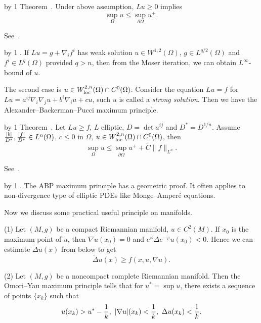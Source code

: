 \advance\propcount by 1
\proclaim Theorem~\propnumber.
Under above assumption, $Lu\geq 0$ implies
$$\sup_\Omega u\leq\sup_{\partial\Omega}u^+.$$

\demo
See~\cite[Theorem 8.1]{G-T}.
\enddemo

\advance\propcount by 1
.
If $Lu=g+\nabla_if^i$ has weak solution $u\in W^{1,2}(\Omega)$, $g\in L^{q/2}(\Omega)$ and $f^i\in L^q(\Omega)$ provided $q>n$, then from the Moser iteration, we can obtain $L^\infty$-bound of $u$.
\medskip

The second case is $u\in W^{2,n}_{\rm loc}(\Omega)\cap C^0(\bar\Omega)$.
Consider the equation $Lu=f$ for $Lu=a^{ij}\nabla_i\nabla_ju+b^i\nabla_iu+cu$, such $u$ is called a {\it strong solution}.
Then we have the Alexander--Backerman--Pucci maximum principle.

\advance\propcount by 1
\proclaim Theorem~\propnumber.
Let $Lu\geq f$, $L$ elliptic, $D=\det{a^{ij}}$ and $D^*=D^{1/n}$.
Assume ${|b|\over D^*},{|f|\over D^*}\in L^n(\Omega)$, $c\leq 0$ in $\Omega$, $u\in W^{2,n}_{\rm loc}(\Omega)\cap C^0(\bar\Omega)$, then
$$\sup_\Omega u\leq\sup_{\partial\Omega}u^++\tilde{C}\|f\|_{L^n}.$$

\demo
See~\cite[Theorem 9.1]{G-T}.
\enddemo

\advance\propcount by 1
.
The ABP maximum principle has a geometric proof.
It often applies to non-divergence type of elliptic PDEs like Monge--Amper\'e equations.
\medskip

Now we discuss some practical useful principle on manifolds.
\smallskip
\item {(1)} Let $(M,g)$ be a compact Riemannian manifold, $u\in C^2(M)$.
If $x_0$ is the maximum point of $u$, then $\nabla u(x_0)=0$ and $e^\varphi\Delta e^{-\varphi}u(x_0)<0$.
Hence we can estimate $\tilde{\Delta}u(x)$ from below to get
$$\tilde{\Delta}u(x)\geq f(x,u,\nabla u).$$
\item {(2)} Let $(M,g)$ be a noncompact complete Riemannian manifold.
Then the Omori--Yau maximum principle tells that for $u^*=\sup u$, there exists a sequence of points $\{x_k\}$ such that
$$u(x_k)>u^*-{1\over k},\ |\nabla u|(x_k)<{1\over k},\ \Delta u(x_k)<{1\over k}.$$

\endsection